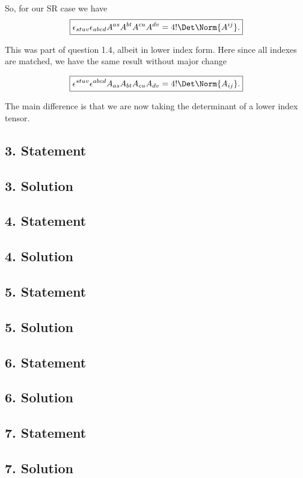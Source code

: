 So, for our SR case we have
\begin{equation}\label{eqn:relElectroDynProblemSet3:n}
\boxed{
\epsilon_{s t u v} \epsilon_{a b c d} A^{a s} A^{b t} A^{c u} A^{d v}= 4! \Det \Norm{A^{ij}}.
}
\end{equation}

This was part of question 1.4, albeit in lower index form.  Here since all indexes are matched, we have the same result without major change

\begin{equation}\label{eqn:relElectroDynProblemSet3:n}
\boxed{
\epsilon^{s t u v} \epsilon^{a b c d} A_{a s} A_{b t} A_{c u} A_{d v}= 4! \Det \Norm{A_{ij}}.
}
\end{equation}

The main difference is that we are now taking the determinant of a lower index tensor.

\subsection{3. Statement}
\subsection{3. Solution}
\subsection{4. Statement}
\subsection{4. Solution}
\subsection{5. Statement}
\subsection{5. Solution}
\subsection{6. Statement}
\subsection{6. Solution}
\subsection{7. Statement}
\subsection{7. Solution}
